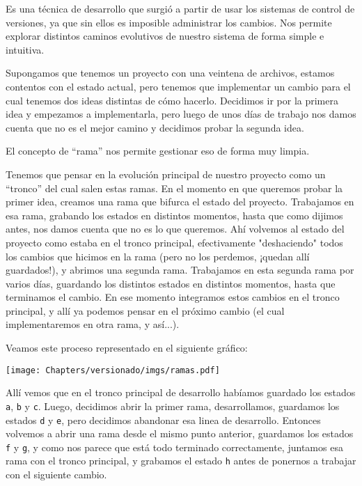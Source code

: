 Es una técnica de desarrollo que surgió a partir de usar los sistemas de control de versiones, ya que sin ellos es imposible administrar los cambios. Nos permite explorar distintos caminos evolutivos de nuestro sistema de forma simple e intuitiva.

Supongamos que tenemos un proyecto con una veintena de archivos, estamos contentos con el estado actual, pero tenemos que implementar un cambio para el cual tenemos dos ideas distintas de cómo hacerlo. Decidimos ir por la primera idea y empezamos a implementarla, pero luego de unos días de trabajo nos damos cuenta que no es el mejor camino y decidimos probar la segunda idea. 

El concepto de ``rama'' nos permite gestionar eso de forma muy limpia.

Tenemos que pensar en la evolución principal de nuestro proyecto como un ``tronco'' del cual salen estas ramas.  En el momento en que queremos probar la primer idea, creamos una rama que bifurca el estado del proyecto. Trabajamos en esa rama, grabando los estados en distintos momentos, hasta que como dijimos antes, nos damos cuenta que no es lo que queremos. Ahí volvemos al estado del proyecto como estaba en el tronco principal, efectivamente "deshaciendo" todos los cambios que hicimos en la rama (pero no los perdemos, ¡quedan allí guardados!), y abrimos una segunda rama. Trabajamos en esta segunda rama por varios días, guardando los distintos estados en distintos momentos, hasta que terminamos el cambio. En ese momento integramos estos cambios en el tronco principal, y allí ya podemos pensar en el próximo cambio (el cual implementaremos en otra rama, y así...).

Veamos este proceso representado en el siguiente gráfico:

\begin{center}
    \texttt{[image: Chapters/versionado/imgs/ramas.pdf]}
\end{center}

Allí vemos que en el tronco principal de desarrollo habíamos guardado los estados \verb|a|, \verb|b| y \verb|c|. Luego, decidimos abrir la primer rama, desarrollamos, guardamos los estados \verb|d| y \verb|e|, pero decidimos abandonar esa linea de desarrollo. Entonces volvemos a abrir una rama desde el mismo punto anterior, guardamos los estados \verb|f| y \verb|g|, y como nos parece que está todo terminado correctamente, juntamos esa rama con el tronco principal, y grabamos el estado \verb|h| antes de ponernos a trabajar con el siguiente cambio.



